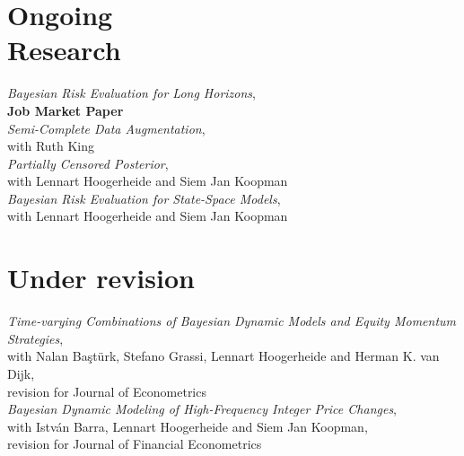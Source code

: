 \documentclass[margin,line]{resume}
\begin{document}
\begin{resume}
\section{\mysidestyle Ongoing \\Research } 
   	\textit{Bayesian Risk Evaluation for Long Horizons},\\ 
   	\textbf{Job Market Paper} \vspace{1mm} \\ 
   	\textit{Semi-Complete Data Augmentation},\\ 
    with Ruth King \vspace{1mm} \\   
   	\textit{Partially Censored Posterior},\\ 
    with Lennart Hoogerheide and Siem Jan Koopman\vspace{1mm} \\   	
   	\textit{Bayesian Risk Evaluation for State-Space Models},\\ 
    with Lennart Hoogerheide and Siem Jan Koopman\vspace{1mm} \\  
      
\vspace{-4mm}

\section{\mysidestyle Under revision}
	\textit{Time-varying Combinations of Bayesian Dynamic Models and Equity Momentum Strategies},\\
	with Nalan Ba\c{s}t\"{u}rk, Stefano Grassi, Lennart Hoogerheide and Herman K. van Dijk,\\
	revision for Journal of Econometrics \vspace{1mm} \\ 
	\textit{Bayesian Dynamic Modeling of High-Frequency Integer Price Changes},\\
	with Istv\'{a}n Barra, Lennart Hoogerheide and Siem Jan Koopman,\\
	revision for Journal of Financial Econometrics



 \newpage	


\end{resume}
\end{document}
